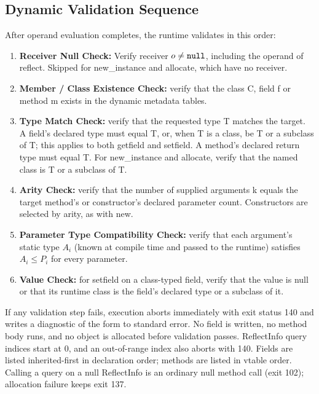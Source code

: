 \subsection*{Dynamic Validation Sequence}
After operand evaluation completes, the runtime validates in this order:
\begin{enumerate}
  \item \textbf{Receiver Null Check:} Verify receiver $o \neq \mathtt{null}$,
    including the operand of reflect. Skipped for new\_instance and allocate,
    which have no receiver.
  \item \textbf{Member / Class Existence Check:} verify that the class C, field
    f or method m exists in the dynamic metadata tables.
  \item \textbf{Type Match Check:} verify that the requested type T matches
    the target. A field's declared type must equal T, or, when T is a class,
    be T or a subclass of T; this applies to both getfield and setfield. A
    method's declared return type must equal T. For new\_instance and
    allocate, verify that the named class is T or a subclass of T.
  \item \textbf{Arity Check:} verify that the number of supplied arguments k
    equals the target method's or constructor's declared parameter count.
    Constructors are selected by arity, as with new.
  \item \textbf{Parameter Type Compatibility Check:} verify that each
    argument's static type $A_i$ (known at compile time and passed to the
    runtime) satisfies $A_i \le P_i$ for every parameter.
  \item \textbf{Value Check:} for setfield on a class-typed field, verify
    that the value is null or that its runtime class is the field's declared
    type or a subclass of it.
\end{enumerate}
If any validation step fails, execution aborts immediately with exit status
140 and writes a diagnostic of the form  to
standard error. No field is written, no method body runs, and no object is
allocated before validation passes. ReflectInfo query indices start at 0, and
an out-of-range index also aborts with 140. Fields are listed inherited-first
in declaration order; methods are listed in vtable order. Calling a query on a
null ReflectInfo is an ordinary null method call (exit 102); allocation
failure keeps exit 137.

